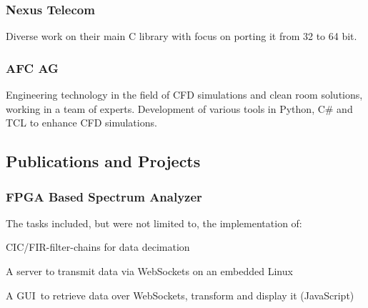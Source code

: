 \begin{timeline}
    \subsubsection{Nexus Telecom}
    Diverse work on their main C library with focus on porting it from 32 to 64 bit.
    \sectionsep
    
    \subsubsection{AFC AG}
    Engineering technology in the field of CFD simulations and clean room solutions, working in a team of experts.
    Development of various tools in Python, C\# and TCL to enhance CFD simulations.
    \sectionsep
    
    
    
    \subsection{Publications and Projects}
    
    \subsubsection{FPGA Based Spectrum Analyzer}
    The tasks included, but were not limited to, the implementation of:
    \begin{tightemize}
    \item CIC/FIR-filter-chains for data decimation
    \item A server to transmit data via WebSockets on an embedded Linux
    \item A GUI to retrieve data over WebSockets, transform and display it (JavaScript)
    \end{tightemize}
    \sectionsep
    

\end{timeline}
